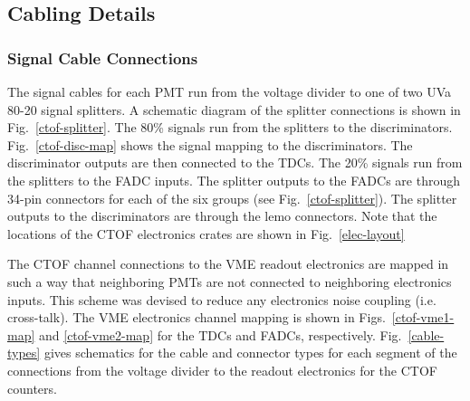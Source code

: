 \documentclass[12pt]{article}
\begin{document}
\subsection{Cabling Details}

\subsubsection{Signal Cable Connections}
\label{signal-conn}

The signal cables for each PMT run from the voltage divider to one of two UVa 80-20 signal splitters. A
schematic diagram of the splitter connections is shown in Fig.~\ref{ctof-splitter}. The 80\% signals run from
the splitters to the discriminators. Fig.~\ref{ctof-disc-map} shows the signal mapping to the discriminators.
The discriminator outputs are then connected to the TDCs. The 20\% signals run from the splitters to the
FADC inputs. The splitter outputs to the FADCs are through 34-pin connectors for each of the six groups (see 
Fig.~\ref{ctof-splitter}). The splitter outputs to the discriminators are through the lemo connectors. Note
that the locations of the CTOF electronics crates are shown in Fig.~\ref{elec-layout}

The CTOF channel connections to the VME readout electronics are mapped in such a way that neighboring PMTs
are not connected to neighboring electronics inputs. This scheme was devised to reduce any electronics noise
coupling (i.e. cross-talk). The VME electronics channel mapping is shown in Figs.~\ref{ctof-vme1-map} and 
\ref{ctof-vme2-map} for the TDCs and FADCs, respectively. Fig.~\ref{cable-types} gives schematics for the
cable and connector types for each segment of the connections from the voltage divider to the readout electronics
for the CTOF counters.
\end{document}
